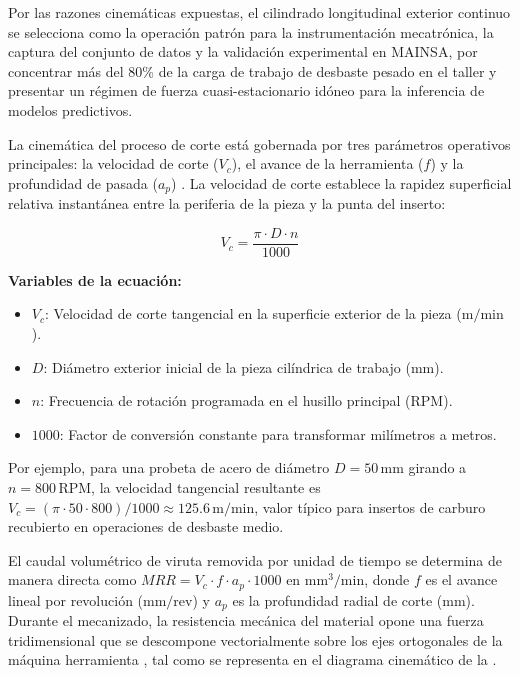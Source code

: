 Por las razones cinemáticas expuestas, el cilindrado longitudinal exterior continuo se selecciona como la operación patrón para la instrumentación mecatrónica, la captura del conjunto de datos y la validación experimental en MAINSA, por concentrar más del 80\% de la carga de trabajo de desbaste pesado en el taller y presentar un régimen de fuerza cuasi-estacionario idóneo para la inferencia de modelos predictivos.

La cinemática del proceso de corte está gobernada por tres parámetros operativos principales: la velocidad de corte ($V_c$), el avance de la herramienta ($f$) y la profundidad de pasada ($a_p$) \citep{kalpakjian2014}. La velocidad de corte establece la rapidez superficial relativa instantánea entre la periferia de la pieza y la punta del inserto:

\begin{equation}
V_c = \frac{\pi \cdot D \cdot n}{1000}
\label{eq:velocidad_corte}
\end{equation}

\noindent\textbf{Variables de la ecuación:}
\begin{itemize}
    \item $V_c$: Velocidad de corte tangencial en la superficie exterior de la pieza ($\text{m/min}$).
    \item $D$: Diámetro exterior inicial de la pieza cilíndrica de trabajo ($\text{mm}$).
    \item $n$: Frecuencia de rotación programada en el husillo principal ($\text{RPM}$).
    \item $1000$: Factor de conversión constante para transformar milímetros a metros.
\end{itemize}

Por ejemplo, para una probeta de acero de diámetro $D = 50\,\text{mm}$ girando a $n = 800\,\text{RPM}$, la velocidad tangencial resultante es $V_c = (\pi \cdot 50 \cdot 800)/1000 \approx 125.6\,\text{m/min}$, valor típico para insertos de carburo recubierto en operaciones de desbaste medio.

El caudal volumétrico de viruta removida por unidad de tiempo se determina de manera directa como $MRR = V_c \cdot f \cdot a_p \cdot 1000$ en $\text{mm}^3/\text{min}$, donde $f$ es el avance lineal por revolución ($\text{mm/rev}$) y $a_p$ es la profundidad radial de corte ($\text{mm}$). Durante el mecanizado, la resistencia mecánica del material opone una fuerza tridimensional que se descompone vectorialmente sobre los ejes ortogonales de la máquina herramienta \citep{trejo2010, sandvik2020}, tal como se representa en el diagrama cinemático de la .

